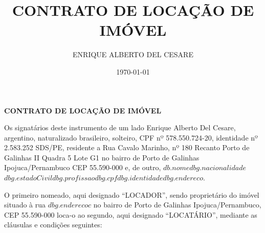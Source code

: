\documentclass[a4paper,12pt]{article}
\date{\today}
\author{ENRIQUE ALBERTO DEL CESARE}
\title{CONTRATO DE LOCAÇÃO DE IMÓVEL}
\begin{document}
\thispagestyle{empty}
\begin{center}{\bf \huge CONTRATO DE LOCAÇÃO DE IMÓVEL}\\[5.1cm] \end{center} 
\newcommand\n{\newcommand}


Os signatários deste  instrumento de um lado Enrique Alberto Del Cesare,
argentino, naturalizado brasileiro, solteiro, CPF nº 578.550.724-20, identidade nº 2.583.252 SDS\//PE, 
residente a Rua Cavalo Marinho, nº 180 Recanto Porto de Galinhas II Quadra 5 Lote G1 
no bairro de Porto de Galinhas Ipojuca/Pernambuco CEP 55.590-000 e, de outro,
${db.nome}$${dbg.nacionalidade}$${dbg.estadoCivil}$${dbg.profissao}$${dbg.cpf}$${dbg.identidade}$${dbg.endereco}$. 

O primeiro nomeado, aqui designado “LOCADOR”, sendo proprietário do imóvel situado à rua ${dbg.enderecoc}$  
no bairro de Porto de Galinhas Ipojuca\//Pernambuco, CEP 55.590-000 loca-o ao segundo, aqui designado “LOCATÁRIO”, mediante as cláusulas e condições seguintes:
\end{document}
